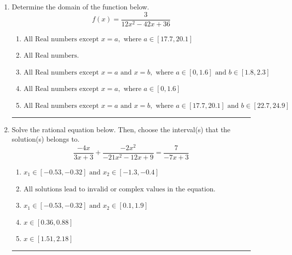 \documentclass[14pt]{extbook}
\newcommand{\litem}[1]{\item#1\hspace*{-1cm}\rule{\textwidth}{0.4pt}}
\begin{document}
\begin{enumerate}
{\begin{enumerate}[label=\Alph*.]
\end{enumerate} }
\litem{
Determine the domain of the function below.\[ f(x) = \frac{3}{12x^{2} -42 x + 36} \]\begin{enumerate}[label=\Alph*.]
\item \( \text{All Real numbers except } x = a, \text{ where } a \in [17.7, 20.1] \)
\item \( \text{All Real numbers.} \)
\item \( \text{All Real numbers except } x = a \text{ and } x = b, \text{ where } a \in [0, 1.6] \text{ and } b \in [1.8, 2.3] \)
\item \( \text{All Real numbers except } x = a, \text{ where } a \in [0, 1.6] \)
\item \( \text{All Real numbers except } x = a \text{ and } x = b, \text{ where } a \in [17.7, 20.1] \text{ and } b \in [22.7, 24.9] \)

\end{enumerate} }
\litem{
Solve the rational equation below. Then, choose the interval(s) that the solution(s) belongs to.\[ \frac{-4x}{3x + 3} + \frac{-2x^{2}}{-21x^{2} -12 x + 9} = \frac{7}{-7x + 3} \]\begin{enumerate}[label=\Alph*.]
\item \( x_1 \in [-0.53, -0.32] \text{ and } x_2 \in [-1.3,-0.4] \)
\item \( \text{All solutions lead to invalid or complex values in the equation.} \)
\item \( x_1 \in [-0.53, -0.32] \text{ and } x_2 \in [0.1,1.9] \)
\item \( x \in [0.36,0.88] \)
\item \( x \in [1.51,2.18] \)


\end{enumerate}}
\end{enumerate}
\end{document}
